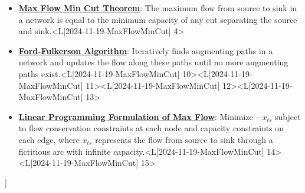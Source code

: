 \documentclass{article}%
\begin{document}
\begin{itemize}[[leftmargin=*]]%
\item \href{https://www.math.purdue.edu/~yipn/421/2024-11-19-MaxFlowMinCut.pdf#page=4}{\textbf{Max Flow Min Cut Theorem}}: The maximum flow from source to sink in a network is equal to the minimum capacity of any cut separating the source and sink.<L[2024-11-19-MaxFlowMinCut] 4>%
\item \href{https://www.math.purdue.edu/~yipn/421/2024-11-19-MaxFlowMinCut.pdf#page=10}{\textbf{Ford{-}Fulkerson Algorithm}}: Iteratively finds augmenting paths in a network and updates the flow along these paths until no more augmenting paths exist.<L[2024-11-19-MaxFlowMinCut] 10><L[2024-11-19-MaxFlowMinCut] 11><L[2024-11-19-MaxFlowMinCut] 12><L[2024-11-19-MaxFlowMinCut] 13>%
\item \href{https://www.math.purdue.edu/~yipn/421/2024-11-19-MaxFlowMinCut.pdf#page=14}{\textbf{Linear Programming Formulation of Max Flow}}: Minimize $-x_{ts}$ subject to flow conservation constraints at each node and capacity constraints on each edge, where $x_{ts}$ represents the flow from source to sink through a fictitious arc with infinite capacity.<L[2024-11-19-MaxFlowMinCut] 14><L[2024-11-19-MaxFlowMinCut] 15>%
\end{itemize}%
\begin{itemize}[[leftmargin=*]]%
%
\end{itemize}%
\end{document}
